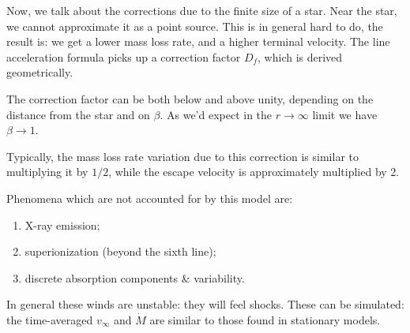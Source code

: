 \documentclass[main.tex]{subfiles}
\begin{document}
Now, we talk about the corrections due to the finite size of a star. Near the star, we cannot approximate it as a point source.
This is in general hard to do, the result is: we get a lower mass loss rate, and a higher terminal velocity. 
The line acceleration formula picks up a correction factor \(D_f\), which is derived geometrically. 


The correction factor can be both below and above unity, depending on the distance from the star and on \(\beta \). 
As we'd expect in the \(r \rightarrow \infty \) limit we have \(\beta \rightarrow 1\). 

Typically, the mass loss rate variation due to this correction is similar to multiplying it by \(1/2\), while the escape velocity is approximately multiplied by 2. 

Phenomena which are not accounted for by this model are: 
\begin{enumerate}
    \item X-ray emission;
    \item superionization (beyond the sixth line);
    \item discrete absorption components \& variability.
\end{enumerate}

In general these winds are unstable: they will feel shocks. 
These can be simulated: the time-averaged \(v_{ \infty }\) and \(\dot{M}\) are similar to those found in stationary models. 
\end{document}
